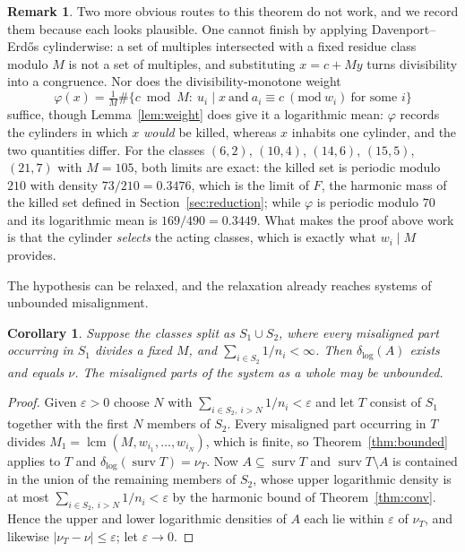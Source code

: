 \documentclass[11pt]{article}
\theoremstyle{plain}
\newtheorem{corollary}[theorem]{Corollary}
\theoremstyle{definition}
\newtheorem{remark}[theorem]{Remark}
\newcommand{\dlog}{\delta_{\log}}
\begin{document}
\begin{remark}\label{rem:gap}
Two more obvious routes to this theorem do not work, and we
record them because each looks plausible.  One cannot finish by
applying Davenport--Erd\H{o}s cylinderwise: a set of multiples
intersected with a fixed residue class modulo $M$ is not a set
of multiples, and substituting $x=c+My$ turns divisibility into
a congruence.  Nor does the divisibility-monotone weight
\[
  \varphi(x)=\tfrac1M\#\{c\bmod M:\ u_i\mid x\ \text{and}\
  a_i\equiv c\ (\mathrm{mod}\ w_i)\ \text{for some }i\}
\]
suffice, though Lemma~\ref{lem:weight} does give it a
logarithmic mean: $\varphi$ records the cylinders in which $x$
\emph{would} be killed, whereas $x$ inhabits one cylinder, and
the two quantities differ.  For the classes $(6,2)$, $(10,4)$,
$(14,6)$, $(15,5)$, $(21,7)$ with $M=105$, both limits are
exact: the killed set is periodic modulo $210$ with density
$73/210=0.3476$, which is the limit of $F$, the harmonic mass of
the killed set defined in Section~\ref{sec:reduction}; while
$\varphi$ is periodic modulo $70$ and its logarithmic mean is
$169/490=0.3449$.  What makes the proof above work is that the
cylinder \emph{selects} the acting classes, which is exactly
what $w_i\mid M$ provides.
\end{remark}

The hypothesis can be relaxed, and the relaxation already
reaches systems of unbounded misalignment.

\begin{corollary}\label{cor:mixed}
Suppose the classes split as $S_1\cup S_2$, where every
misaligned part occurring in $S_1$ divides a fixed $M$, and
$\sum_{i\in S_2}1/n_i<\infty$.  Then $\dlog(A)$ exists and
equals $\nu$.  The misaligned parts of the system as a whole
may be unbounded.
\end{corollary}

\begin{proof}
Given $\varepsilon>0$ choose $N$ with
$\sum_{i\in S_2,\ i>N}1/n_i<\varepsilon$ and let $T$ consist of
$S_1$ together with the first $N$ members of $S_2$.  Every
misaligned part occurring in $T$ divides
$M_1=\operatorname{lcm}(M,w_{i_1},\dots,w_{i_N})$, which is
finite, so Theorem~\ref{thm:bounded} applies to $T$ and
$\dlog(\operatorname{surv}T)=\nu_T$.  Now
$A\subseteq\operatorname{surv}T$ and
$\operatorname{surv}T\setminus A$ is contained in the union of
the remaining members of $S_2$, whose upper logarithmic density
is at most $\sum_{i\in S_2,\ i>N}1/n_i<\varepsilon$ by the
harmonic bound of Theorem~\ref{thm:conv}.  Hence the upper and
lower logarithmic densities of $A$ each lie within $\varepsilon$
of $\nu_T$, and likewise $|\nu_T-\nu|\le\varepsilon$; let
$\varepsilon\to0$.
\end{proof}
\end{document}

